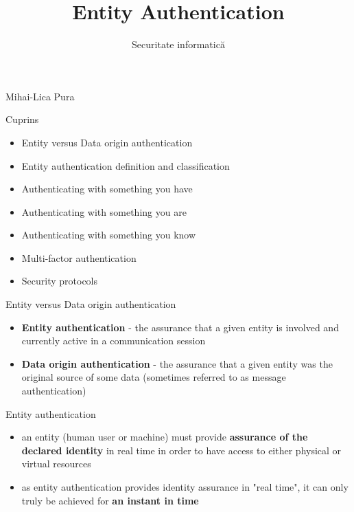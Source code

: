 \documentclass[pdf]{beamer}
\title{Entity Authentication}
\subtitle{Securitate informatică}
\begin{document}
\begin{frame}
	\titlepage

\begin{flushright}
Mihai-Lica Pura\\
\end{flushright}

\end{frame}



\begin{frame}{Cuprins}
\begin{itemize}
\item
Entity versus Data origin authentication
\item
Entity authentication definition and classification
\item
Authenticating with something you have
\item
Authenticating with something you are
\item
Authenticating with something you know
\item
Multi-factor authentication
\item
Security protocols
\end{itemize}
\end{frame}



\begin{frame}{Entity versus Data origin authentication}
\begin{itemize}
\item
\textbf{Entity authentication} - the assurance that a given entity is involved and currently active in a communication session
\newline

\item
\textbf{Data origin authentication} - the assurance that a given entity was the original source of some data (sometimes referred to as message authentication)
\end{itemize}
\end{frame}



\begin{frame}{Entity authentication}
\begin{itemize}
\item
an entity (human user or machine) must provide \textbf{assurance of the declared identity} in real time in order to have access to either physical or virtual resources
\item
as entity authentication provides identity assurance in "real time", it can only truly be achieved for \textbf{an instant in time}
\end{itemize}
\end{frame}
\end{document}
